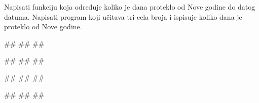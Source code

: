 \begin{Exercise}[label=p1.4_] 
Napisati funkciju  koja određuje koliko je dana proteklo od Nove godine do
datog datuma. Napisati program koji učitava tri cela broja i ispisuje
koliko dana je proteklo od Nove godine.

\begin{miditest}
\begin{upotreba}{1}
#\naslovInt#
##
##
\end{upotreba}
\end{miditest}
\begin{miditest}
\begin{upotreba}{2}
#\naslovInt#
##
##
\end{upotreba}
\end{miditest}

\begin{miditest}
\begin{upotreba}{3}
#\naslovInt#
##
##
\end{upotreba}
\end{miditest}
\begin{miditest}
\begin{upotreba}{4}
#\naslovInt#
##
##
\end{upotreba}
\end{miditest}

\end{Exercise}

